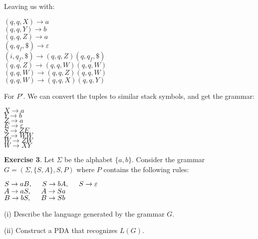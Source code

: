 \documentclass{article}
\begin{document}
Leaving us with:

\begin{center}
	$(q, q, X) \rightarrow a$ \\
	$(q, q, Y) \rightarrow b$ \\
	$(q, q, Z) \rightarrow a$ \\
	$(q, q_f, \$) \rightarrow \varepsilon$ \\
	$(i, q_f, \$) \rightarrow (q, q, Z)(q, q_f, \$)$ \\ 
	$(q, q, Z) \rightarrow (q, q, W)(q, q, W)$ \\
	$(q, q, W) \rightarrow (q, q, Z)(q, q, W)$ \\
	$(q, q, W) \rightarrow (q, q, X)(q, q, Y)$ \\
\end{center}

For $P'$. We can convert the tuples to similar stack symbols, and get the grammar: 

\begin{center}
	$X \rightarrow a$ \\
	$Y \rightarrow b$ \\
	$Z \rightarrow a$ \\
	$E \rightarrow \varepsilon$ \\
	$S \rightarrow ZE$ \\ 
	$Z \rightarrow WW$ \\
	$W \rightarrow ZW$ \\
	$W \rightarrow XY$ \\
\end{center}


\textbf{Exercise 3}. Let $\Sigma$ be the alphabet $\{a, b\}$.  Consider the grammar $G =
(\Sigma, \{S, A\}, S, P)$ where $P$ contains the following rules:\\
\begin{center}
$S \rightarrow aB,\hspace{0.5cm} S \rightarrow bA, \hspace{0.5cm} S \rightarrow \varepsilon$\\
$A \rightarrow aS,\hspace{0.5cm} A \rightarrow Sa$\\
$B \rightarrow bS,\hspace{0.5cm} B \rightarrow Sb$\\
\end{center}

(i) Describe the language generated by the grammar $G$.

(ii) Construct a PDA that recognizes $L(G)$.\\
\end{document}
